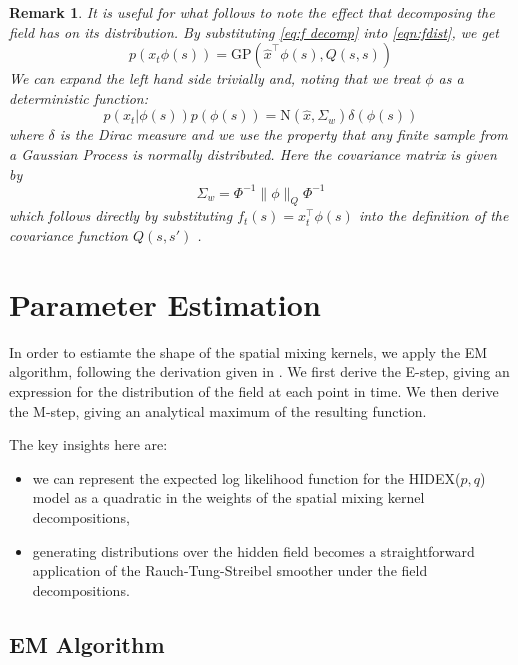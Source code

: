 \documentclass{IEEEtran}
\newcommand{\dist}[2]{\|#1\|_{#2}}
\newtheorem{remark}{Remark}
\begin{document}
\begin{remark}
	It is useful for what follows to note the effect that decomposing the field has on its distribution. By substituting \ref{eq:f decomp} into \ref{eqn:fdist}, we get
	\begin{equation}
		p(x_t\phi(s)) = \mathrm{GP}(\hat{x}^\top\phi(s),Q(s,s))
	\end{equation}
	We can expand the left hand side trivially and, noting that we treat $\phi$ as a deterministic function:
	 \begin{equation}
		p(x_t|\phi(s))p(\phi(s)) = \mathrm{N}(\hat{x},\Sigma_w)\delta(\phi(s))
	\end{equation}
	where $\delta$ is the Dirac measure and we use the property that any finite sample from a Gaussian Process is normally distributed. Here the covariance matrix is given by
	\begin{equation}
		\Sigma_w = \Phi^{-1}\dist{\phi}{Q} \Phi^{-1}
	\end{equation}
	which follows directly by substituting $f_t(s) = x_t^\top\phi(s)$ into the definition of the covariance function $Q(s,s')$ \cite{Scerri09}.
\end{remark}

\section{Parameter Estimation}

In order to estiamte the shape of the spatial mixing kernels, we apply the EM algorithm, following the derivation given in \cite{GibsonNinness}. We first derive the E-step, giving an expression for the distribution of the field at each point in time. We then derive the M-step, giving an analytical maximum of the resulting function.

The key insights here are:
\begin{itemize}
	\item we can represent the expected log likelihood function for the HIDEX($p,q$) model as a quadratic in the weights of the spatial mixing kernel decompositions,
	\item generating distributions over the hidden field becomes a straightforward application of the Rauch-Tung-Streibel smoother \cite{Rauch} under the field decompositions.
\end{itemize} 

\subsection{EM Algorithm}
\end{document}
